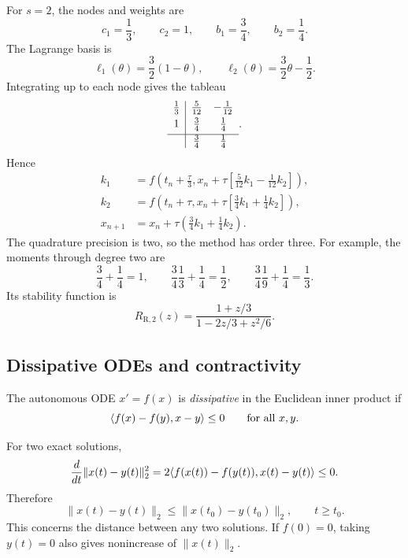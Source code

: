 For \(s=2\), the nodes and weights are
\[
 c_1=\frac13,\qquad c_2=1,
 \qquad b_1=\frac34,\qquad b_2=\frac14.
\]
The Lagrange basis is
\[
 \ell_1(\theta)=\frac32(1-\theta),\qquad
 \ell_2(\theta)=\frac32\theta-\frac12.
\]
Integrating up to each node gives the tableau
\begin{equation}\label{eq:radau-two-tableau-sep-25}
 \begin{array}{c|cc}
  \tfrac13&\tfrac5{12}&-\tfrac1{12}\\[3pt]
  1&\tfrac34&\tfrac14\\[3pt] \hline
   &\tfrac34&\tfrac14
 \end{array}.
\end{equation}
Hence
\begin{align*}
 k_1&=f\left(t_n+\frac\tau3,
                    x_n+\tau\left[\frac5{12}k_1-\frac1{12}k_2\right]\right),\\
 k_2&=f\left(t_n+\tau,
                    x_n+\tau\left[\frac34k_1+\frac14k_2\right]\right),\\
 x_{n+1}&=x_n+\tau\left(\frac34k_1+\frac14k_2\right).
\end{align*}
The quadrature precision is two, so the method has order three.
For example, the moments through degree two are
\[
 \frac34+\frac14=1,\qquad
 \frac34\frac13+\frac14=\frac12,\qquad
 \frac34\frac19+\frac14=\frac13.
\]
Its stability function is
\begin{equation}\label{eq:radau-two-stability-sep-25}
 R_{\mathrm{R},2}(z)=\frac{1+z/3}{1-2z/3+z^2/6}.
\end{equation}

\subsection{Dissipative ODEs and contractivity}

\begin{definition}
 The autonomous ODE \(x'=f(x)\) is \emph{dissipative} in the
 Euclidean inner product if
 \begin{equation}\label{eq:dissipative-condition-sep-25}
  \langle f(x)-f(y), x-y \rangle\leq0
       \qquad\text{for all }x,y.
 \end{equation}
\end{definition}

For two exact solutions,
\[
 \frac{d}{dt}\|x(t)-y(t)\|_2^2
   =2\langle f(x(t))-f(y(t)), x(t)-y(t) \rangle\leq0.
\]
Therefore
\begin{equation}\label{eq:exact-contractivity-sep-25}
 \|x(t)-y(t)\|_2\leq\|x(t_0)-y(t_0)\|_2,
 \qquad t\geq t_0.
\end{equation}
This concerns the distance between any two solutions. If \(f(0)=0\),
taking \(y(t)=0\) also gives nonincrease of \(\|x(t)\|_2\).

